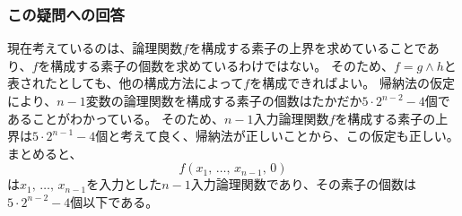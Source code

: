 \documentclass[a4paper,11pt,uplatex]{jsarticle}%
\begin{document}
\subsubsection*{この疑問への回答}
現在考えているのは、論理関数$f$を構成する素子の上界を求めていることであり、$f$を構成する素子の個数を求めているわけではない。
そのため、$f=g\wedge h$と表されたとしても、他の構成方法によって$f$を構成できればよい。
帰納法の仮定により、$n-1$変数の論理関数を構成する素子の個数はたかだか$5\cdot 2^{n-2}-4$個であることがわかっている。
そのため、$n-1$入力論理関数$f$を構成する素子の上界は$5\cdot 2^{n-1}-4$個と考えて良く、帰納法が正しいことから、この仮定も正しい。
まとめると、
\begin{equation}
  f(x_1,\,\ldots,\,x_{n-1},\,0)
\end{equation}
は$x_1,\,\ldots,\,x_{n-1}$を入力とした$n-1$入力論理関数であり、その素子の個数は$5\cdot 2^{n-2}-4$個以下である。
\end{document}
